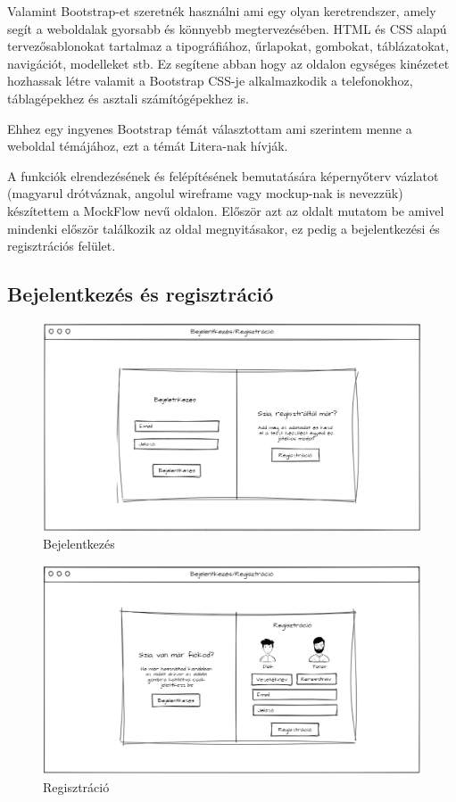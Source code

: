 Valamint Bootstrap-et szeretnék használni ami egy olyan keretrendszer, amely segít a weboldalak gyorsabb és könnyebb megtervezésében. HTML és CSS alapú tervezősablonokat tartalmaz a tipográfiához, űrlapokat, gombokat, táblázatokat, navigációt, modelleket stb. Ez segítene abban hogy az oldalon egységes kinézetet hozhassak létre valamit a Bootstrap CSS-je alkalmazkodik a telefonokhoz, táblagépekhez és asztali számítógépekhez is.

Ehhez egy ingyenes Bootstrap témát választottam ami szerintem menne a weboldal témájához, ezt a témát Litera-nak\cite{litera} hívják.


A funkciók elrendezésének és felépítésének bemutatására képernyőterv vázlatot (magyarul drótváznak, angolul wireframe vagy mockup-nak is nevezzük) készítettem a MockFlow \cite{mockflow} nevű oldalon.
Először azt az oldalt mutatom be amivel mindenki először találkozik az oldal megnyitásakor, ez pedig a bejelentkezési és regisztrációs felület.

\subsection{Bejelentkezés és regisztráció}

\begin{figure}[H]
    \centering
    \includegraphics[width=\linewidth]{images/login_wireframe.png}
    \caption{Bejelentkezés}
    \label{fig:login_wireframe}
\end{figure}

\begin{figure}[H]
    \centering
    \includegraphics[width=\linewidth]{images/signin_wireframe.png}
    \caption{Regisztráció}
    \label{fig:signin_wireframe}
\end{figure}

